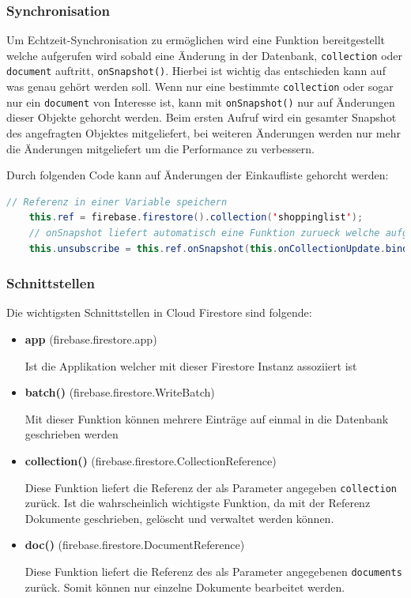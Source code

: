 \subsubsection{Synchronisation}
Um Echtzeit-Synchronisation zu ermöglichen wird eine Funktion bereitgestellt welche aufgerufen wird sobald eine Änderung in der Datenbank, \verb|collection| oder \verb|document| auftritt, \verb|onSnapshot()|. Hierbei ist wichtig das entschieden kann auf was genau gehört werden soll. Wenn nur eine bestimmte \verb|collection| oder sogar nur ein \verb|document| von Interesse ist, kann mit \verb|onSnapshot()| nur auf Änderungen dieser Objekte gehorcht werden. Beim ersten Aufruf wird ein gesamter Snapshot des angefragten Objektes mitgeliefert, bei weiteren Änderungen werden nur mehr die Änderungen mitgeliefert um die Performance zu verbessern. 

Durch folgenden Code kann auf Änderungen der Einkaufliste gehorcht werden:

\begin{lstlisting}[language=java]
	// Referenz in einer Variable speichern
	this.ref = firebase.firestore().collection('shoppinglist');
	// onSnapshot liefert automatisch eine Funktion zurueck welche aufgerufen werden kann um sich von Updates "abzumelden"
	this.unsubscribe = this.ref.onSnapshot(this.onCollectionUpdate.bind(this))
\end{lstlisting}
\clearpage
\subsubsection{Schnittstellen}
Die wichtigsten Schnittstellen in Cloud Firestore sind folgende\cite{Interfac64:online}:

\begin{itemize}
	\item \textbf{app} (firebase.firestore.app)
	
	Ist die Applikation welcher mit dieser Firestore Instanz assoziiert ist
	\item \textbf{batch()} (firebase.firestore.WriteBatch)
	
	Mit dieser Funktion können mehrere Einträge auf einmal in die Datenbank geschrieben werden
	\item \textbf{collection()} (firebase.firestore.CollectionReference)
	
	Diese Funktion liefert die Referenz der als Parameter angegeben \verb|collection| zurück. Ist die wahrscheinlich wichtigste Funktion, da mit der Referenz Dokumente geschrieben, gelöscht und verwaltet werden können.
	\item \textbf{doc()} (firebase.firestore.DocumentReference)
	
	Diese Funktion liefert die Referenz des als Parameter angegebenen \verb|documents| zurück. Somit können nur einzelne Dokumente bearbeitet werden. 
\end{itemize}
